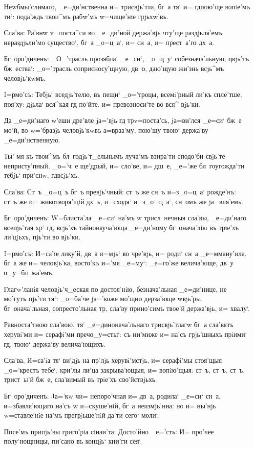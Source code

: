 Неwбмы'слимаго, _е=ди'нственна и= трисвjь'тла, бг~а 
тя` и= гд пою'ще вопiе'мъ ти`: пода'ждь твои^мъ 
рабw'мъ w=чище'нiе грjьхw'въ.

Сла'ва: Ра'внw v=поста^си во _е=ди'ной держа'вjь 
чту'ще раздjьля'емъ нераздjьли'мо существо`, бг~а 
_о=ц~а`, и= сн~а, и= прест~а'го дх~а.

Бг~оро'диченъ: _О='трасль прозябла` _е=си`, _о=ц~у` 
собезнача'льную, цвjь'тъ бж~ества`: _о='трасль 
соприсносу'щную, дв~о, даю'щую жи'знь всjь^мъ 
человjь'кwмъ.


I=рмо'съ: Тебjь` вседjь'телю, въ пещи` _о='троцы, 
всемi'рный ли'къ спле'тше, поя'ху: дjьла` вся^кая гд 
по'йте, и= превозноси'те во вся^ вjь'ки.

Да _е=ди'наго w'еши дре'вле jа='вjь гд 
тр v=поста'сь, jа=ви'лся _е=си` бж~е мо'й, во 
w='бразjь человjь'кwвъ а=враа'му, пою'щу твою` держа'ву 
_е=ди'нственную.

Ты' мя къ твои^мъ бл~годjь'т_ельнымъ луча'мъ взира'ти 
сподо'би свjь'те непристу'пный, _о='ч~е ще'дрый, и= 
сло'ве, и= дш~е, _е='же бл~гоугожда'ти тебjь` при'снw, 
гд всjь'хъ.

Сла'ва: Ст~ъ _о=ц~ъ бг~ъ превjь'чный: ст~ъ же сн~ъ 
и=з\ъ _о=ц~а` рожде'нъ: ст~ъ же и= животворя'щiй дх~ъ, 
и=сходя` и=з\ъ _о=ц~а`, сн~омъ же jа=вля'емь.

Бг~оро'диченъ: W=блиста'ла _е=си` на'мъ w\т 
трисл~нечныя сла'вы, _е=ди'наго всепjь'тая хр` гд, 
всjь'хъ тайнонауча'юща _е=ди'ному бг~онача'лiю въ трiе'хъ 
ли'цjьхъ, пjь'ти во вjь'ки.


I=рмо'съ: И=са'iе лику'й, дв~а и=мjь` во чре'вjь, и= 
роди` сн~а _е=мману'ила, бг~а же и= человjь'ка, восто'къ 
и='мя _е=му`: _е=го'же велича'юще, дв~у о_у=бл~жа'емъ.

Глагw'ланiя человjь'ч_еская по достоя'нiю, 
безнача'льная _е=ди'нице, не мо'гутъ пjь'ти тя`: _о=ба'че 
jа='коже мо'щно дерза'юще w\т вjь'ры, бг~онача'льная, 
сопресто'льная тр, сла'ву прино'симъ твое'й 
держа'вjь, и= хвалу`.

Равноста'тною сла'вою, тя` _е=динонача'льнаго 
трисвjь'тлагw бг~а сла'вятъ херувi'ми и= серафi'ми 
преч о_у=сты`: съ ни'миже и= на'съ грjь'шныхъ 
прiими` гд, твою` держа'ву велича'ющихъ. 

Сла'ва, И=са'iа тя` ви'дjь на пр'лjь херувi'мстjь, 
и= серафi'мы стоя'щыя _о='крестъ тебе`, кри'лы ли'ца 
закрыва'ющыя, и= вопiю'щыя: ст~ъ, ст~ъ, ст~ъ, трист~ы'й 
бж~е, сла'вимый въ трiе'хъ сво'йствjьхъ.

Бг~оро'диченъ: Jа='кw ч и= непоро'чная и= дв~а, 
родила` _е=си` сн~а, и=збавля'ющаго на'съ w\т 
и=скуше'нiй, бг~а неизмjь'нна: но и= ны'нjь w=ставле'нiе 
на'мъ прегрjьше'нiй да'ти сего` моли`. 

Посе'мъ припjь'вы григо'рiа сiнаи'та: Досто'йно 
_е='сть: И= про'чее полу'нощницы, пи'сано въ концjь` 
кни'ги сея`.
